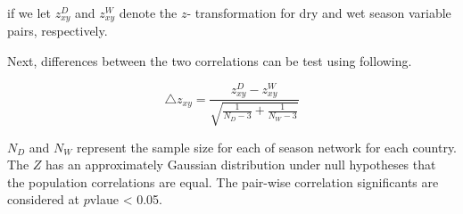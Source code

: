 if we let $z_{xy}^D $ and $z_{xy}^W$ denote the $z$- transformation for dry and wet season variable pairs, respectively.

Next, differences between the two correlations can be test using following. 

\begin{equation}
\triangle z_{xy} = \frac{z_{xy}^D - z_{xy}^W}{\sqrt{\frac{1}{N_{D}-3}+ \frac{1}{N_{W}-3}}}
\end{equation}

$N_{D}$ and $N_{W}$ represent the sample size for each of season network for each country. The $Z$ has an approximately Gaussian distribution under null hypotheses that the population correlations are equal. The pair-wise correlation significants are considered at $p$vlaue < 0.05.

